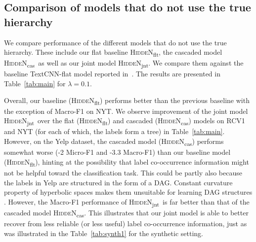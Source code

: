 \documentclass[11pt,a4paper]{article}
\newcommand{\modeljnt}{\mbox{\textsc{HiddeN}\textsubscript{jnt}}}
\newcommand{\modelcas}{\mbox{\textsc{HiddeN}\textsubscript{cas}}}
\newcommand{\modelflt}{\mbox{\textsc{HiddeN}\textsubscript{flt}}}
\begin{document}
\subsection{Comparison of models that do not use the true hierarchy}
We compare performance of the different models that do not use the true hierarchy. These include our flat baseline \modelflt, the cascaded model \modelcas\ as well as our joint model \modeljnt. We compare them against the baseline TextCNN-flat model reported in~\citet{emnlp}. The results are presented in Table~\ref{tab:main} for $\lambda=0.1$.

Overall, our baseline (\modelflt) performs better than the previous baseline with the exception of Macro-F1 on NYT. We observe improvement of the joint model \modeljnt\ over the flat (\modelflt) and cascaded (\modelcas) models on RCV1 and NYT (for each of which, the labels form a tree) in Table~\ref{tab:main}. However, on the Yelp dataset, the cascaded model (\modelcas) performs somewhat worse (-2 Micro-F1 and -3.3 Macro-F1) than our baseline model (\modelflt), hinting at the possibility that label co-occurrence information might not be helpful toward the classification task. This could be partly also because the labels in Yelp are structured in the form of a DAG. Constant curvature property of hyperbolic spaces makes them unsuitable for learning DAG structures \cite{li2018smoothing}. However, the Macro-F1 performance of \modeljnt\ is far better than that of the cascaded model \modelcas. This illustrates that our joint model is able to better recover from less reliable (or less useful) label co-occurrence information, just as was illustrated in the Table~\ref{tab:synth1} for the synthetic setting.
\end{document}
